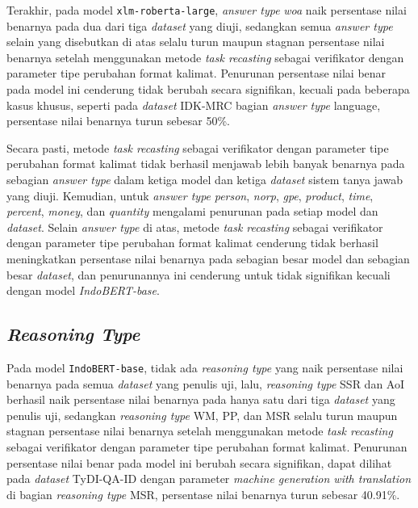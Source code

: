 Terakhir, pada model \texttt{xlm-roberta-large}, \emph{answer type} \emph{woa} naik persentase nilai benarnya pada dua dari tiga \emph{dataset} yang diuji, sedangkan semua \emph{answer type} selain yang disebutkan di atas selalu turun maupun stagnan persentase nilai benarnya setelah menggunakan metode \emph{task recasting} sebagai verifikator dengan parameter tipe perubahan format kalimat. Penurunan persentase nilai benar pada model ini cenderung tidak berubah secara signifikan, kecuali pada beberapa kasus khusus, seperti pada \emph{dataset} IDK-MRC bagian \emph{answer type} {language}, persentase nilai benarnya turun sebesar 50\%.

Secara pasti, metode \emph{task recasting} sebagai verifikator dengan parameter tipe perubahan format kalimat tidak berhasil menjawab lebih banyak benarnya pada sebagian \emph{answer type} dalam ketiga model dan ketiga \emph{dataset} sistem tanya jawab yang diuji. Kemudian, untuk \emph{answer type} \emph{person}, \emph{norp}, \emph{gpe}, \emph{product}, \emph{time}, \emph{percent}, \emph{money}, dan \emph{quantity} mengalami penurunan pada setiap model dan \emph{dataset}. Selain \emph{answer type} di atas, metode \emph{task recasting} sebagai verifikator dengan parameter tipe perubahan format kalimat cenderung tidak berhasil meningkatkan persentase nilai benarnya pada sebagian besar model dan sebagian besar \emph{dataset}, dan penurunannya ini cenderung untuk tidak signifikan kecuali dengan model \emph{IndoBERT-base}. 

\subsection{\emph{Reasoning Type}}
Pada model \texttt{IndoBERT-base}, tidak ada \emph{reasoning type} yang naik persentase nilai benarnya pada semua \emph{dataset} yang penulis uji, lalu, \emph{reasoning type} SSR dan AoI berhasil naik persentase nilai benarnya pada hanya satu dari tiga \emph{dataset} yang penulis uji, sedangkan \emph{reasoning type} WM, PP, dan MSR selalu turun maupun stagnan persentase nilai benarnya setelah menggunakan metode \emph{task recasting} sebagai verifikator dengan parameter tipe perubahan format kalimat. Penurunan persentase nilai benar pada model ini berubah secara signifikan, dapat dilihat pada \emph{dataset} TyDI-QA-ID  dengan parameter \emph{machine generation with translation} di bagian \emph{reasoning type} MSR, persentase nilai benarnya turun sebesar 40.91\%.

